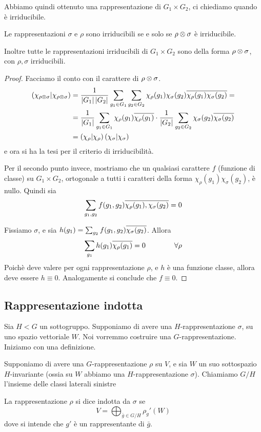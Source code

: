 	Abbiamo quindi ottenuto una rappresentazione di $G_1\times G_2$, ci chiediamo quando è irriducibile. 
	\begin{myprop}
		Le rappresentazioni $\sigma$ e $\rho$ sono irriducibili se e solo se $\rho \otimes \sigma$ è irriducibile.
		
		Inoltre tutte le rappresentazioni irriducibili di $G_1\times G_2$ sono della forma $\rho \otimes \sigma$, con $\rho,\sigma$ irriducibili.
	\end{myprop}
	\begin{proof}
		Facciamo il conto con il carattere di $\rho \otimes \sigma$.
		\begin{align*}
		\left(\chi_{\rho\otimes\sigma} | \chi_{\rho\otimes\sigma}\right) &= \frac1{\left|G_1\right|\left|G_2\right|}\sum_{g_1 \in G_1}\sum_{g_2\in G_2} \chi_\rho(g_1)\chi_\sigma(g_2)\overline{\chi_\rho(g_1)\chi_\sigma(g_2)} = \\
		&= \frac1{\left|G_1\right|}\sum_{g_1 \in G_1} \chi_\rho(g_1)\overline{\chi_\rho(g_1)}\cdot\frac1{\left|G_2\right|}\sum_{g_2\in G_2}\chi_\sigma(g_2)\overline{\chi_\sigma(g_2)}\\
		&= \left(\chi_\rho | \chi_\rho\right)\left(\chi_\sigma | \chi_\sigma\right)
		\end{align*}
		e ora si ha la tesi per il criterio di irriducibilità.
		
		Per il secondo punto invece, mostriamo che un qualsiasi carattere $f$ (funzione di classe) su $G_1\times G_2$, ortogonale a tutti i caratteri della forma $\chi_\rho(g_1)\chi_\sigma(g_2)$, è nullo. Quindi sia
		\[
		\sum_{g_1,g_2} f(g_1,g_2) \overline{\chi_\rho(g_1),\chi_\sigma(g_2)}=0
		\]
		
		Fissiamo $\sigma$, e sia $h(g_1)=\sum_{g_2} f(g_1,g_2)\overline{\chi_\sigma(g_2)}$. Allora
		\[
		\sum_{g_1}h(g_1)\overline{\chi_\rho(g_1)}=0 \qquad\qquad \forall \rho
		\]
		Poichè deve valere per ogni rappresentazione $\rho$, e $h$ è una funzione classe, allora deve essere $h\equiv 0$. Analogamente si conclude che $f \equiv 0$.
	\end{proof}
	
	\subsection{Rappresentazione indotta}
		Sia $H<G$ un sottogruppo. Supponiamo di avere una $H$-rappresentazione $\sigma$, su uno spazio vettoriale $W$. Noi vorremmo costruire una $G$-rappresentazione. Iniziamo con una definizione.
		
		\begin{mydef}
		 Supponiamo di avere una $G$-rappresentazione $\rho$ su $V$, e sia $W$ un suo sottospazio $H$-invariante (ossia su $W$ abbiamo una $H$-rappresentazione $\sigma$). Chiamiamo $G/H$ l'insieme delle classi laterali sinistre
		 
		 La rappresentazione $\rho$ si dice indotta da $\sigma$ se 
		 \[
		  V = \bigoplus_{\bar g \in G/H} \rho_g'(W) 
		 \]
		 dove si intende che $g'$ è un rappresentante di $\bar g$.
		\end{mydef}
		
